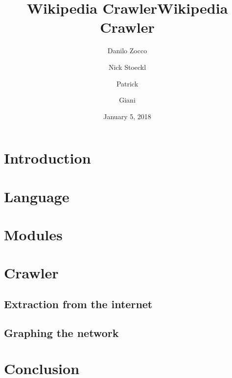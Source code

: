 \documentclass{article}
\author{Danilo Zocco \and Nick Stoeckl\\ \and Patrick \and Giani}
\title{Wikipedia Crawler}
\date{January 5, 2018}
\begin{document}
\maketitle
\newpage

\title{Wikipedia Crawler}
\section{Introduction}
\section{Language}
\section{Modules}
\section{Crawler}
\subsection{Extraction from the internet}
\subsection{Graphing the network}
\section{Conclusion}



% 
%
\end{document}
